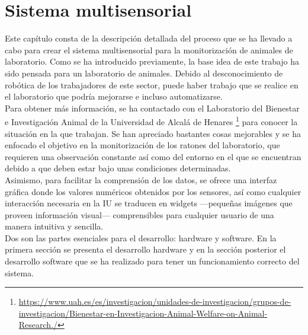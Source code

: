 \chapter{Sistema multisensorial }
\label{cap:capitulo4}



\vspace{1cm}
Este capítulo consta de la descripción detallada del proceso que se ha llevado a cabo para crear el sistema multisensorial para la monitorización de animales de laboratorio. Como se ha introducido previamente, la base idea de este trabajo ha sido pensada para un laboratorio de animales. Debido al desconocimiento de robótica de los trabajadores de este sector, puede haber trabajo que se realice en el laboratorio que podría mejorarse e incluso automatizarse.\\

Para obtener más información, se ha contactado con el Laboratorio del Bienestar e Investigación Animal de la Universidad de Alcalá de Henares \footnote{\url{https://www.uah.es/es/investigacion/unidades-de-investigacion/grupos-de-investigacion/Bienestar-en-Investigacion-Animal-Welfare-on-Animal-Research./}} para conocer la situación en la que trabajan. Se han apreciado bastantes cosas mejorables y se ha enfocado el objetivo en la monitorización de los ratones del laboratorio, que requieren una observación constante así como del entorno en el que se encuentran debido a que deben estar bajo unas condiciones determinadas.\\

Asimismo, para facilitar la comprensión de los datos, se ofrece una interfaz gráfica donde los valores numéricos obtenidos por los sensores, así como cualquier interacción necesaria en la IU se traducen en widgets ---pequeñas imágenes que proveen información visual--- comprensibles para cualquier usuario de una manera intuitiva y sencilla.\\

Dos son las partes esenciales para el desarrollo: hardware y software. En la primera sección se presenta el desarrollo hardware y en la sección posterior el desarrollo software que se ha realizado para tener un funcionamiento correcto del sistema.

